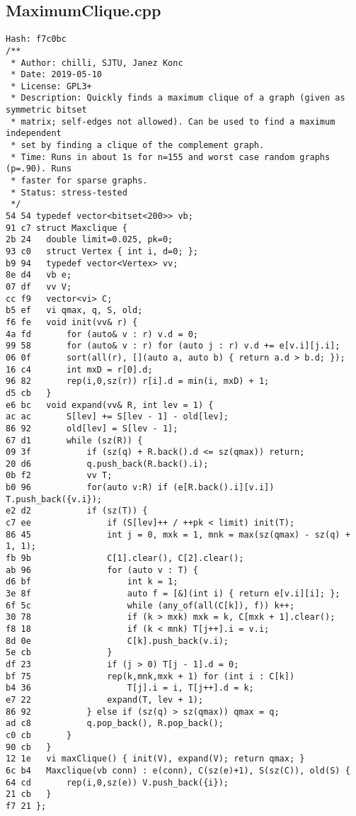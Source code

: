 \documentclass[11pt, a4paper, twoside]{article}
\begin{document}
\subsection{MaximumClique.cpp}
\begin{lstlisting}
Hash: f7c0bc
/**
 * Author: chilli, SJTU, Janez Konc
 * Date: 2019-05-10
 * License: GPL3+
 * Description: Quickly finds a maximum clique of a graph (given as symmetric bitset
 * matrix; self-edges not allowed). Can be used to find a maximum independent
 * set by finding a clique of the complement graph.
 * Time: Runs in about 1s for n=155 and worst case random graphs (p=.90). Runs
 * faster for sparse graphs.
 * Status: stress-tested
 */
54 54 typedef vector<bitset<200>> vb;
91 c7 struct Maxclique {
2b 24 	double limit=0.025, pk=0;
93 c0 	struct Vertex { int i, d=0; };
b9 94 	typedef vector<Vertex> vv;
8e d4 	vb e;
07 df 	vv V;
cc f9 	vector<vi> C;
b5 ef 	vi qmax, q, S, old;
f6 fe 	void init(vv& r) {
4a fd 		for (auto& v : r) v.d = 0;
99 58 		for (auto& v : r) for (auto j : r) v.d += e[v.i][j.i];
06 0f 		sort(all(r), [](auto a, auto b) { return a.d > b.d; });
16 c4 		int mxD = r[0].d;
96 82 		rep(i,0,sz(r)) r[i].d = min(i, mxD) + 1;
d5 cb 	}
e6 bc 	void expand(vv& R, int lev = 1) {
ac ac 		S[lev] += S[lev - 1] - old[lev];
86 92 		old[lev] = S[lev - 1];
67 d1 		while (sz(R)) {
09 3f 			if (sz(q) + R.back().d <= sz(qmax)) return;
20 d6 			q.push_back(R.back().i);
0b f2 			vv T;
b0 96 			for(auto v:R) if (e[R.back().i][v.i]) T.push_back({v.i});
e2 d2 			if (sz(T)) {
c7 ee 				if (S[lev]++ / ++pk < limit) init(T);
86 45 				int j = 0, mxk = 1, mnk = max(sz(qmax) - sz(q) + 1, 1);
fb 9b 				C[1].clear(), C[2].clear();
ab 96 				for (auto v : T) {
d6 bf 					int k = 1;
3e 8f 					auto f = [&](int i) { return e[v.i][i]; };
6f 5c 					while (any_of(all(C[k]), f)) k++;
30 78 					if (k > mxk) mxk = k, C[mxk + 1].clear();
f8 18 					if (k < mnk) T[j++].i = v.i;
8d 0e 					C[k].push_back(v.i);
5e cb 				}
df 23 				if (j > 0) T[j - 1].d = 0;
bf 75 				rep(k,mnk,mxk + 1) for (int i : C[k])
b4 36 					T[j].i = i, T[j++].d = k;
e7 22 				expand(T, lev + 1);
86 92 			} else if (sz(q) > sz(qmax)) qmax = q;
ad c8 			q.pop_back(), R.pop_back();
c0 cb 		}
90 cb 	}
12 1e 	vi maxClique() { init(V), expand(V); return qmax; }
6c b4 	Maxclique(vb conn) : e(conn), C(sz(e)+1), S(sz(C)), old(S) {
64 cd 		rep(i,0,sz(e)) V.push_back({i});
21 cb 	}
f7 21 };
\end{lstlisting}
\end{document}
